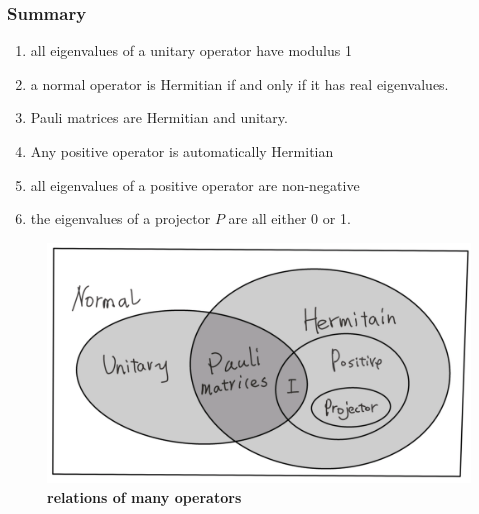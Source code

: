 \subsubsection{Summary} %
\begin{enumerate}
    \item all eigenvalues of a unitary operator have modulus 1
    \item a normal operator is Hermitian if and only if it has real eigenvalues.
    \item Pauli matrices are Hermitian and unitary.
    \item Any positive operator is automatically Hermitian
    \item all eigenvalues of a positive operator are non-negative
    \item the eigenvalues of a projector $P$ are all either 0 or 1.
\end{enumerate}

\begin{figure}[h]
    \centering
    \includegraphics[width=0.75\linewidth]{Images/relations of many operators.png}
    \caption{\textbf{relations of many operators} }
\end{figure}